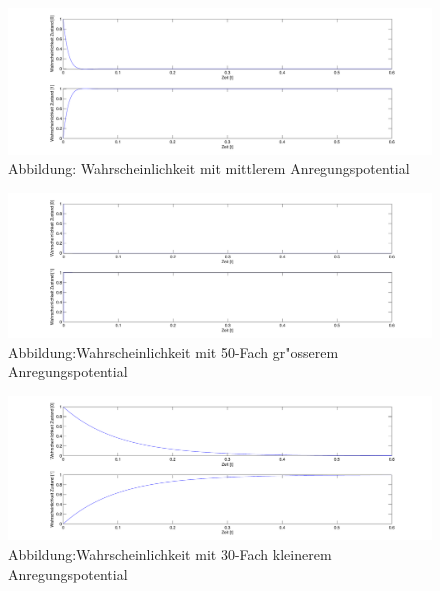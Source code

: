 \begin{refsection}
\begin{figure}
\centering
\includegraphics[width=1\textwidth]{flash/graphics/potentialmittel.pdf}
\caption{Abbildung: Wahrscheinlichkeit mit mittlerem Anregungspotential
\label{skript:potentialmittel}}
\end{figure}

\begin{figure}
\centering
\includegraphics[width=1\textwidth]{flash/graphics/potentialgross.pdf}
\caption{Abbildung:Wahrscheinlichkeit mit 50-Fach gr"osserem Anregungspotential
\label{skript:potentialgross}}
\end{figure}

\begin{figure}
\centering
\includegraphics[width=1\textwidth]{flash/graphics/potentialklein.pdf}
\caption{Abbildung:Wahrscheinlichkeit mit 30-Fach kleinerem Anregungspotential
\label{skript:potentialklein}}
\end{figure}

\printbibliography[heading=subbibliography]
\end{refsection}
